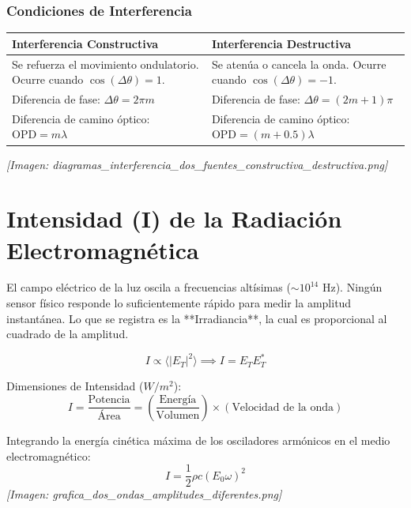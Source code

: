 \documentclass[12pt]{article}
\begin{document}
	\subsubsection*{Condiciones de Interferencia}
	\begin{center}
		\begin{tabular}{|p{}|p{}|}
			\hline
			\textbf{Interferencia Constructiva} & \textbf{Interferencia Destructiva} \\
			\hline
			Se refuerza el movimiento ondulatorio. Ocurre cuando $\cos(\Delta\theta) = 1$. & Se atenúa o cancela la onda. Ocurre cuando $\cos(\Delta\theta) = -1$. \\
			Diferencia de fase: $\Delta\theta = 2\pi m$ & Diferencia de fase: $\Delta\theta = (2m+1)\pi$ \\
			Diferencia de camino óptico: $\text{OPD} = m\lambda$ & Diferencia de camino óptico: $\text{OPD} = (m + 0.5)\lambda$ \\
			\hline
		\end{tabular}
	\end{center}
	\textit{[Imagen: diagramas\_interferencia\_dos\_fuentes\_constructiva\_destructiva.png]}
	
	\section{Intensidad (I) de la Radiación Electromagnética}
	El campo eléctrico de la luz oscila a frecuencias altísimas ($\sim 10^{14}$ Hz). Ningún sensor físico responde lo suficientemente rápido para medir la amplitud instantánea. Lo que se registra es la **Irradiancia**, la cual es proporcional al cuadrado de la amplitud.
	
	\begin{equation*}
		I \propto \langle |E_T|^2 \rangle \implies I = E_T E_T^*
	\end{equation*}
	
	Dimensiones de Intensidad ($W/m^2$):
	\begin{equation*}
		I = \frac{\text{Potencia}}{\text{Área}} = \left(\frac{\text{Energía}}{\text{Volumen}}\right) \times (\text{Velocidad de la onda})
	\end{equation*}
	
	Integrando la energía cinética máxima de los osciladores armónicos en el medio electromagnético:
	\begin{equation*}
		I = \frac{1}{2} \rho c (E_0 \omega)^2
	\end{equation*}
	\textit{[Imagen: grafica\_dos\_ondas\_amplitudes\_diferentes.png]}
	
\end{document}
